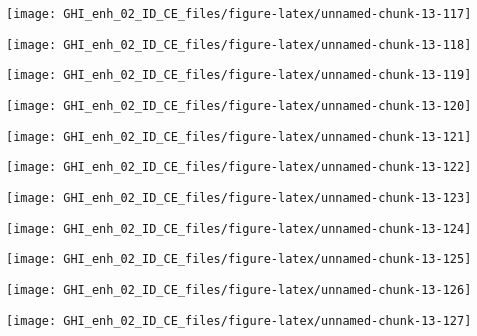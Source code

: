 \documentclass[
  10pt,
  a4paper,oneside]{article}
\begin{document}
\begin{center}\texttt{[image: GHI\_enh\_02\_ID\_CE\_files/figure-latex/unnamed-chunk-13-117]} \end{center}

\begin{center}\texttt{[image: GHI\_enh\_02\_ID\_CE\_files/figure-latex/unnamed-chunk-13-118]} \end{center}

\begin{center}\texttt{[image: GHI\_enh\_02\_ID\_CE\_files/figure-latex/unnamed-chunk-13-119]} \end{center}

\begin{center}\texttt{[image: GHI\_enh\_02\_ID\_CE\_files/figure-latex/unnamed-chunk-13-120]} \end{center}

\begin{center}\texttt{[image: GHI\_enh\_02\_ID\_CE\_files/figure-latex/unnamed-chunk-13-121]} \end{center}

\begin{center}\texttt{[image: GHI\_enh\_02\_ID\_CE\_files/figure-latex/unnamed-chunk-13-122]} \end{center}

\begin{center}\texttt{[image: GHI\_enh\_02\_ID\_CE\_files/figure-latex/unnamed-chunk-13-123]} \end{center}

\begin{center}\texttt{[image: GHI\_enh\_02\_ID\_CE\_files/figure-latex/unnamed-chunk-13-124]} \end{center}

\begin{center}\texttt{[image: GHI\_enh\_02\_ID\_CE\_files/figure-latex/unnamed-chunk-13-125]} \end{center}

\begin{center}\texttt{[image: GHI\_enh\_02\_ID\_CE\_files/figure-latex/unnamed-chunk-13-126]} \end{center}

\begin{center}\texttt{[image: GHI\_enh\_02\_ID\_CE\_files/figure-latex/unnamed-chunk-13-127]} \end{center}
\end{document}
